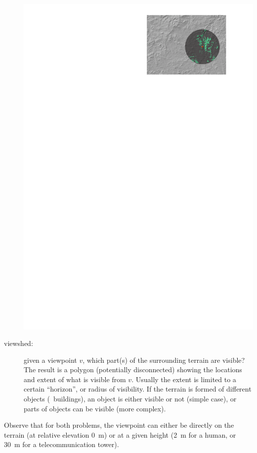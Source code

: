 \begin{description}
\begin{marginfigure}
    \includegraphics[width=\linewidth]{figs/overview_viewshed}
    \caption{The viewshed at the location marked with a red star (green = visible; maximum view distance (dark grey) is set to \qty{15}{\km}).}%
  \end{marginfigure} 
  \item[viewshed:] given a viewpoint $v$, which part(s) of the surrounding terrain are visible? The result is a polygon (potentially disconnected) showing the locations and extent of what is visible from $v$. Usually the extent is limited to a certain ``horizon'', or radius of visibility. If the terrain is formed of different objects (\eg\ buildings), an object is either visible or not (simple case), or parts of objects can be visible (more complex).
\end{description}
Observe that for both problems, the viewpoint can either be directly on the terrain (at relative elevation \qty{0}{\m}) or at a given height (\qty{2}{\m} for a human, or \qty{30}{\m} for a telecommunication tower).

